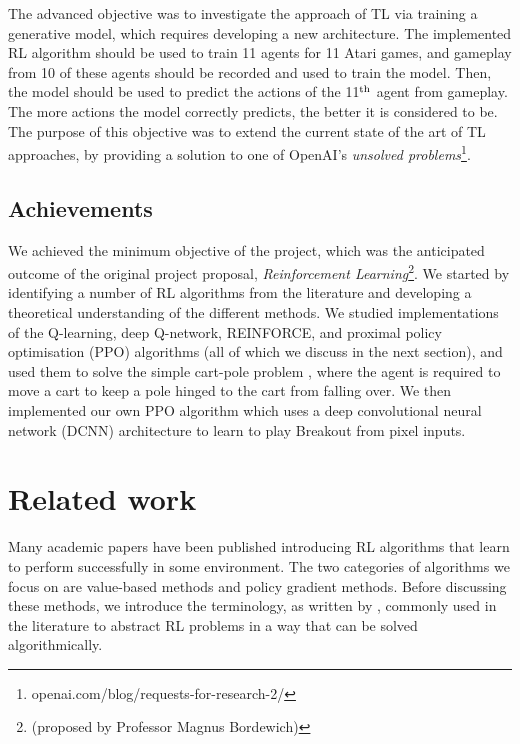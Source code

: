\documentclass[12pt,a4paper]{article}
\begin{document}
The advanced objective was to investigate the approach of TL via training a generative model, which requires developing a new architecture. The implemented RL algorithm should be used to train 11 agents for 11 Atari games, and gameplay from 10 of these agents should be recorded and used to train the model. Then, the model should be used to predict the actions of the 11$\textsuperscript{th}$ agent from gameplay. The more actions the model correctly predicts, the better it is considered to be. The purpose of this objective was to extend the current state of the art of TL approaches, by providing a solution to one of OpenAI's \emph{unsolved problems}\footnote{openai.com/blog/requests-for-research-2/}.   

\subsection{Achievements}
We achieved the minimum objective of the project, which was the anticipated outcome of the original project proposal, \emph{Reinforcement Learning}\footnote{(proposed by Professor Magnus Bordewich)}. We started by identifying a number of RL algorithms from the literature and developing a theoretical understanding of the different methods. We studied implementations of the Q-learning, deep Q-network, REINFORCE, and proximal policy optimisation (PPO) algorithms (all of which we discuss in the next section), and used them to solve the simple cart-pole problem \cite{sutton2018reinforcement}, where the agent is required to move a cart to keep a pole hinged to the cart from falling over. We then implemented our own PPO algorithm which uses a deep convolutional neural network (DCNN) architecture to learn to play Breakout from pixel inputs. 


\section{Related work}
Many academic papers have been published introducing RL algorithms that learn to perform successfully in some environment. The two categories of algorithms we focus on are value-based methods and policy gradient methods. Before discussing these methods, we introduce the terminology, as written by \cite{SpinningUp2018}, commonly used in the literature to abstract RL problems in a way that can be solved algorithmically.
\end{document}
